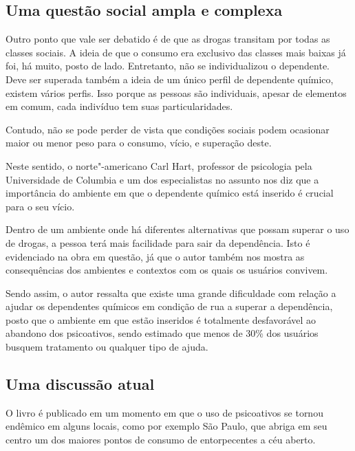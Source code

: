 \documentclass[11pt]{extarticle}
\begin{document}
\subsection{Uma questão social ampla e complexa}

Outro ponto que vale ser debatido é de que as drogas transitam por todas
as classes sociais. A ideia de que o consumo era exclusivo das classes
mais baixas já foi, há muito, posto de lado. Entretanto, não se
individualizou o dependente. Deve ser superada também a ideia de um
único perfil de dependente químico, existem vários perfis. Isso porque
as pessoas são individuais, apesar de elementos em comum, cada indivíduo
tem suas particularidades.


Contudo, não se pode perder de vista que condições sociais podem
ocasionar maior ou menor peso para o consumo, vício, e superação deste.

Neste sentido, o norte"-americano Carl Hart, professor de psicologia pela
Universidade de Columbia e um dos especialistas no assunto nos diz que a
importância do ambiente em que o dependente químico está inserido é
crucial para o seu vício.

Dentro de um ambiente onde há diferentes alternativas que possam superar
o uso de drogas, a pessoa terá mais facilidade para sair da dependência.
Isto é evidenciado na obra em questão, já que o autor também nos mostra
as consequências dos ambientes e contextos com os quais os usuários
convivem.

Sendo assim, o autor ressalta que existe uma grande dificuldade com
relação a ajudar os dependentes químicos em condição de rua a superar a
dependência, posto que o ambiente em que estão inseridos é totalmente
desfavorável ao abandono dos psicoativos, sendo estimado que menos de
30\% dos usuários busquem tratamento ou qualquer tipo de ajuda.

\subsection{Uma discussão atual}

O livro é publicado em um momento em que o uso de psicoativos se tornou
endêmico em alguns locais, como por exemplo São Paulo, que abriga em seu
centro um dos maiores pontos de consumo de entorpecentes a céu aberto.

\end{document}
